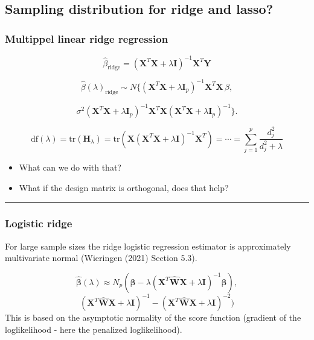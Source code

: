 \documentclass[
  letterpaper,
  DIV=11,
  numbers=noendperiod]{scrartcl}
\providecommand{\tightlist}{%
  \setlength{\itemsep}{0pt}\setlength{\parskip}{0pt}}\usepackage{longtable,booktabs,array}
\begin{document}
\hypertarget{sampling-distribution-for-ridge-and-lasso}{%
\subsection{Sampling distribution for ridge and
lasso?}\label{sampling-distribution-for-ridge-and-lasso}}

\hypertarget{multippel-linear-ridge-regression}{%
\subsubsection{Multippel linear ridge
regression}\label{multippel-linear-ridge-regression}}

\[ \hat{\beta}_{\text{ridge}}=({\boldsymbol X}^T{\boldsymbol X}+\lambda {\boldsymbol I})^{-1} {\boldsymbol X}^T {\boldsymbol Y}\]

\[\hat{\beta}(\lambda)_{\text{ridge}} \sim N \{ (\boldsymbol{X}^T \boldsymbol{X} + \lambda \boldsymbol{I}_{p})^{-1} \boldsymbol{X}^T \boldsymbol{X} \, \beta,\]

\[\sigma^2 ( \boldsymbol{X}^T \boldsymbol{X} + \lambda \boldsymbol{I}_{p} )^{-1}  \boldsymbol{X}^T \boldsymbol{X} ( \boldsymbol{X}^T \boldsymbol{X} + \lambda \boldsymbol{I}_{p} )^{-1}  \}.\]

\[\text{df}(\lambda)=\text{tr}({\boldsymbol H}_{\lambda})=\text{tr}({\boldsymbol X}({\boldsymbol X}^T{\boldsymbol X}+ \lambda {\boldsymbol I})^{-1}{\boldsymbol X}^T)=\cdots=\sum_{j=1}^p \frac{d_j^2}{d_j^2+\lambda}\]

\begin{itemize}
\tightlist
\item
  What can we do with that?
\item
  What if the design matrix is orthogonal, does that help?
\end{itemize}

\begin{center}\rule{0.5\linewidth}{0.5pt}\end{center}

\hypertarget{logistic-ridge}{%
\subsubsection{Logistic ridge}\label{logistic-ridge}}

For large sample sizes the ridge logistic regression estimator is
approximately multivariate normal (Wieringen (2021) Section 5.3).

\[\hat{\boldsymbol\beta}(\lambda) \approx N_{p}(\boldsymbol\beta-\lambda (\boldsymbol X^T\hat{\boldsymbol{W}}\boldsymbol X+\lambda \boldsymbol I)^{-1}\boldsymbol \beta),\]
\[(\boldsymbol X^T\hat{\boldsymbol{W}}\boldsymbol X+\lambda \boldsymbol I)^{-1}-(\boldsymbol X^T\hat{\boldsymbol{W}}\boldsymbol X+\lambda \boldsymbol I)^{-2})\]
This is based on the asymptotic normality of the score function
(gradient of the loglikelihood - here the penalized loglikelihood).
\end{document}
